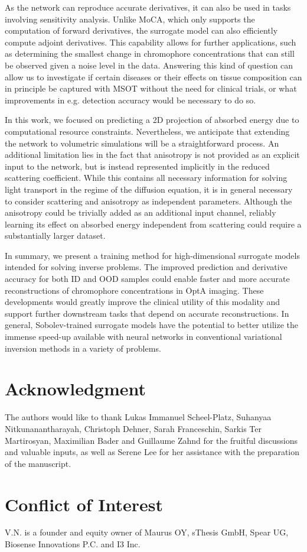 \documentclass[journal,twoside,web]{ieeecolor}
\begin{document}
As the network can reproduce accurate derivatives, it can also be used in tasks involving sensitivity analysis. %
Unlike MoCA, which only supports the computation of forward derivatives, the surrogate model can also efficiently compute adjoint derivatives. %
This capability allows for further applications, such as determining the smallest change in chromophore concentrations that can still be observed given a noise level in the data. %
Answering this kind of question can allow us to investigate if certain diseases or their effects on tissue composition can in principle be captured with MSOT without the need for clinical trials, or what improvements in e.g. detection accuracy would be necessary to do so.\par

In this work, we focused on predicting a 2D projection of absorbed energy due to computational resource constraints. %
Nevertheless, we anticipate that extending the network to volumetric simulations will be a straightforward process. %
An additional limitation lies in the fact that anisotropy is not provided as an explicit input to the network, but is instead represented implicitly in the reduced scattering coefficient. %
While this contains all necessary information for solving light transport in the regime of the diffusion equation, it is in general necessary to consider scattering and anisotropy as independent parameters. %
Although the anisotropy could be trivially added as an additional input channel, reliably learning its effect on absorbed energy independent from scattering could require a substantially larger dataset.\par

In summary, we present a training method for high-dimensional surrogate models intended for solving inverse problems. %
The improved prediction and derivative accuracy for both ID and OOD samples could enable faster and more accurate reconstructions of chromophore concentrations in OptA imaging. %
These developments would greatly improve the clinical utility of this modality and support further downstream tasks that depend on accurate reconstructions. %
In general, Sobolev-trained surrogate models have the potential to better utilize the immense speed-up available with neural networks in conventional variational inversion methods in a variety of problems. %

\appendices
\section*{Acknowledgment}
The authors would like to thank Lukas Immanuel Scheel-Platz, Suhanyaa Nitkunanantharayah, Christoph Dehner, Sarah Franceschin, Sarkis Ter Martirosyan, Maximilian Bader and Guillaume Zahnd for the fruitful discussions and valuable inputs, as well as Serene Lee for her assistance with the preparation of the manuscript.
\section*{Conflict of Interest}
V.N. is a founder and equity owner of Maurus OY, sThesis GmbH, Spear UG, Biosense Innovations P.C. and I3 Inc.


\end{document}
